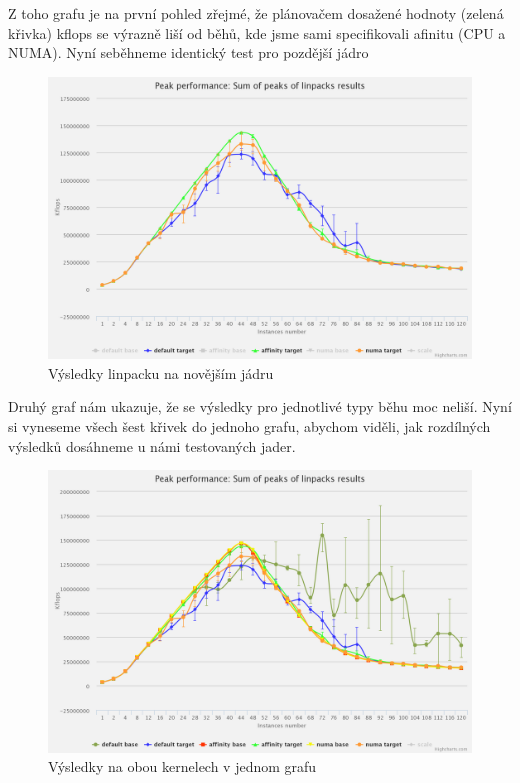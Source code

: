 \documentclass[a4paper,12pt]{article}
\begin{document}
Z toho grafu je na první pohled zřejmé, že plánovačem dosažené hodnoty (zelená křivka) kflops se výrazně liší od běhů, kde jsme sami specifikovali afinitu (CPU a NUMA). Nyní seběhneme identický test pro pozdější jádro

\begin{figure}[ht]
\includegraphics[scale=0.2]{obrazky/LinpackTargetChart.png}
\caption{Výsledky linpacku na novějším jádru}
\label{newer kernel linpack results}
\end{figure}

Druhý graf nám ukazuje, že se výsledky pro jednotlivé typy běhu moc neliší. Nyní si vyneseme všech šest křivek do jednoho grafu, abychom viděli, jak rozdílných výsledků dosáhneme u námi testovaných jader. 

\begin{figure}[ht]
\includegraphics[scale=0.2]{obrazky/LinpackSumChart.png}
\caption{Výsledky na obou kernelech v jednom grafu}
\label{both kernels linpack results}
\end{figure}
\end{document}
